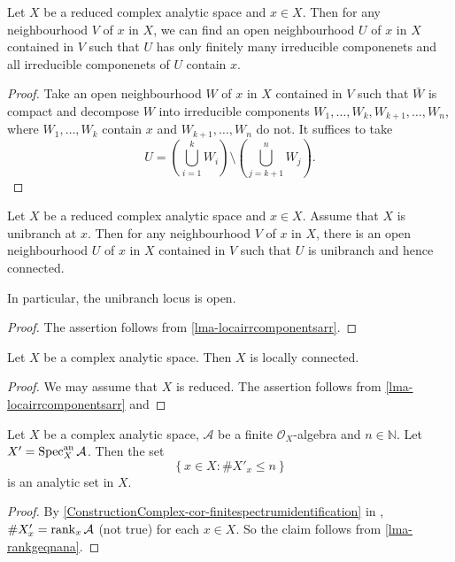 \begin{lemma}\label{lma-locairrcomponentsarr}
    Let $X$ be a reduced complex analytic space and $x\in X$. Then for any neighbourhood $V$ of $x$ in $X$, we can find an open neighbourhood $U$ of $x$ in $X$ contained in $V$ such that $U$ has only finitely many irreducible componenets and all irreducible componenets of $U$ contain $x$.
\end{lemma}
\begin{proof}
    Take an open neighbourhood $W$ of $x$ in $X$ contained in $V$ such that $\bar{W}$ is compact and decompose $W$ into irreducible components $W_1,\ldots,W_k,W_{k+1},\ldots,W_n$, where $W_1,\ldots,W_k$ contain $x$ and $W_{k+1},\ldots,W_n$ do not. It suffices to take 
    \[
        U=\left(\bigcup_{i=1}^k W_i\right)\setminus \left( \bigcup_{j=k+1}^n W_j \right).  
    \]  
\end{proof}

\begin{proposition}\label{prop-unibranchlocusopen}
    Let $X$ be a reduced complex analytic space and $x\in X$. Assume that $X$ is unibranch at $x$. Then for any neighbourhood $V$ of $x$ in $X$, there is an open neighbourhood $U$ of $x$ in $X$ contained in $V$ such that $U$ is unibranch and hence connected.

    In particular, the unibranch locus is open.
\end{proposition}
\begin{proof}
The assertion follows from   \cref{lma-locairrcomponentsarr}. 
\end{proof}
\begin{corollary}\label{cor-caslocallyconnected}
    Let $X$ be a complex analytic space. Then $X$ is locally connected.
\end{corollary}
\begin{proof}
    We may assume that $X$ is reduced.
    The assertion follows from \cref{lma-locairrcomponentsarr} and 
\end{proof}




\iffalse
\begin{corollary}\label{cor-specangeqnanalyt}
    Let $X$ be a complex analytic space, $\mathcal{A}$ be a finite $\mathcal{O}_X$-algebra and $n\in \mathbb{N}$. Let $X'=\operatorname{Spec}_X^{\mathrm{an}}\mathcal{A}$.
    Then the set
    \[
        \left\{x\in X: \# X'_x \leq n \right\}  
    \]
    is an analytic set in $X$.
\end{corollary}
\begin{proof}
    By \cref{ConstructionComplex-cor-finitespectrumidentification} in , $\# X'_x=\rank_x \mathcal{A}$ (not true) for each $x\in X$. So the claim follows from \cref{lma-rankgeqnana}.
\end{proof}

